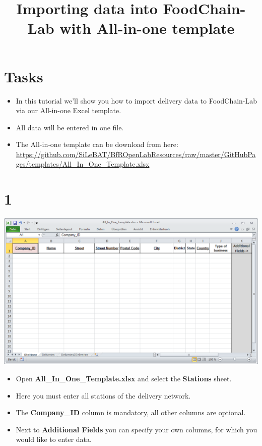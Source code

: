\documentclass{beamer}
\title{Importing data into FoodChain-Lab with All-in-one template}
\date{}
\begin{document}
\maketitle

\section{Tasks}
\begin{frame}
	\begin{itemize}
		\item In this tutorial we'll show you how to import delivery data to FoodChain-Lab via our All-in-one Excel template.
		\item All data will be entered in one file.
		\item The All-in-one template can be download from here: \url{https://github.com/SiLeBAT/BfROpenLabResources/raw/master/GitHubPages/templates/All_In_One_Template.xlsx}
	\end{itemize}
\end{frame}
 
\section{1}
\begin{frame}
	\begin{center}
  		\includegraphics[height=0.5\textheight]{1.png}
	\end{center}
	\begin{itemize}
		\item Open \textbf{All\_In\_One\_Template.xlsx} and select the \textbf{Stations} sheet.
		\item Here you must enter all stations of the delivery network.
		\item The \textbf{Company\_ID} column is mandatory, all other columns are optional.
		\item Next to \textbf{Additional Fields} you can specify your own columns, for which you would like to enter data.
	\end{itemize}
\end{frame}
\end{document}
